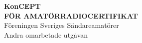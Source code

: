 \AddToShipoutPicture*{\BackgroundPic}

\pagestyle{empty}



\onecolumn
\vspace{3cm}
\begin{center}
{\fontsize{2.4cm}{2.88cm}\bfseries{\color{white}KonCEPT}} \\[2ex]
\Large{\bfseries{\color{white}FÖR AMATÖRRADIOCERTIFIKAT}} \\[2ex]
\huge{\color{white}Föreningen Sveriges Sändareamatörer} \\
\Large{\color{white}Andra omarbetade utgåvan}
\end{center}

\clearpage
